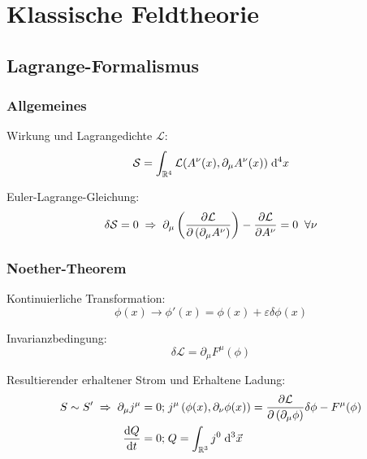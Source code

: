 \section{Klassische Feldtheorie}
	\subsection{Lagrange-Formalismus}
		\subsubsection{Allgemeines}
			\noindent
			Wirkung und Lagrangedichte $\mathcal{L}$:
			\begin{equation}
				\mathcal{S} = \int_{\mathbb{R}^4} \mathcal{L}(A^\nu(x),\partial_\mu A^\nu(x)) \;\mathrm{d}^4 x
			\end{equation}

			\noindent
			Euler-Lagrange-Gleichung:
			\begin{equation}
				\delta\mathcal{S} = 0
				\;\Rightarrow\; \partial_\mu \left(\frac{\partial \mathcal{L}}{\partial \left(\partial_\mu A^\nu\right)}\right) - \frac{\partial \mathcal{L}}{\partial A^\nu} = 0 \;\;\forall \nu
			\end{equation}

		\subsubsection{Noether-Theorem}
			\noindent
			Kontinuierliche Transformation:
			\begin{equation}
				\phi(x)\rightarrow\phi'(x) = \phi(x) + \varepsilon \delta \phi(x)
			\end{equation}

			\noindent
			Invarianzbedingung:
			\begin{equation}
				\delta\mathcal{L} = \partial_\mu F^\mu(\phi)
			\end{equation}

			\noindent
			Resultierender erhaltener Strom und Erhaltene Ladung:
			\begin{equation}
				\begin{aligned}
					S \sim S' \;\Rightarrow\;\partial_\mu j^\mu = 0;&\; j^\mu \left( \phi(x), \partial_\nu\phi(x) \right) = \frac{\partial \mathcal{L}}{\partial \left(\partial_\mu \phi\right)}\delta\phi - F^\mu(\phi) \\
					\frac{\mathrm{d} Q}{\mathrm{d} t} = 0;&\; Q = \int_{\mathbb{R}^3} j^0\;\mathrm{d}^3\vec{x}
				\end{aligned}
			\end{equation}
